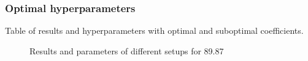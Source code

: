 \subsubsection{Optimal hyperparameters}

Table of results and hyperparameters with optimal and suboptimal coefficients.

\begin{figure}
    \caption{Results and parameters of different setups for 89.87}
    \label{fig:acc-iter}
\end{figure}


